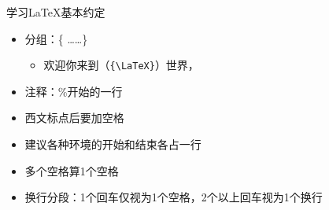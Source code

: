 \documentclass[fontset = adobe, xcolor=svgnames, t, aspectratio=169]{ctexbeamer}
\begin{document}

\begin{frame}[t,fragile]{学习\LaTeX}{基本约定}
  \stretchon
  \begin{itemize}
  \item 分组：\{ \ldots\ldots \}
    \begin{itemize}
    \item 欢迎你来到{\latex}（\verb|{\LaTeX}|）世界，
    \end{itemize}
  \item 注释：\%开始的一行
  \item 西文标点后要加空格
  \item 建议各种环境的开始和结束各占一行
  \item 多个空格算1个空格
  \item \alert{换行分段}：1个回车仅视为1个空格，2个以上回车视为1个换行
  \end{itemize}
  \stretchoff
\end{frame}
\end{document}
